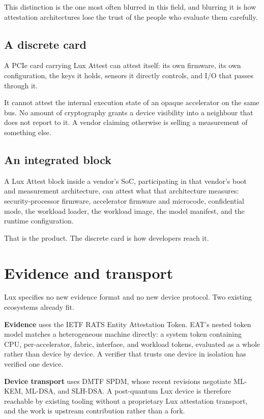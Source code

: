 \documentclass[11pt,a4paper]{article}
\begin{document}
This distinction is the one most often blurred in this field, and blurring it
is how attestation architectures lose the trust of the people who evaluate them
carefully.

\subsection{A discrete card}

A PCIe card carrying Lux Attest can attest itself: its own firmware, its own
configuration, the keys it holds, sensors it directly controls, and I/O that
passes through it.

It cannot attest the internal execution state of an opaque accelerator on the
same bus. No amount of cryptography grants a device visibility into a
neighbour that does not report to it. A vendor claiming otherwise is selling a
measurement of something else.

\subsection{An integrated block}

A Lux Attest block inside a vendor's SoC, participating in that vendor's boot
and measurement architecture, can attest what that architecture measures:
security-processor firmware, accelerator firmware and microcode, confidential
mode, the workload loader, the workload image, the model manifest, and the
runtime configuration.

That is the product. The discrete card is how developers reach it.

\section{Evidence and transport}

Lux specifies no new evidence format and no new device protocol. Two existing
ecosystems already fit.

\textbf{Evidence} uses the IETF RATS Entity Attestation Token. EAT's nested
token model matches a heterogeneous machine directly: a system token containing
CPU, per-accelerator, fabric, interface, and workload tokens, evaluated as a
whole rather than device by device. A verifier that trusts one device in
isolation has verified one device.

\textbf{Device transport} uses DMTF SPDM, whose recent revisions negotiate
ML-KEM, ML-DSA, and SLH-DSA. A post-quantum Lux device is therefore reachable
by existing tooling without a proprietary Lux attestation transport, and the
work is upstream contribution rather than a fork.
\end{document}
